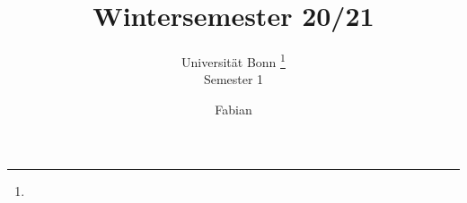 \documentclass[a4paper, 10pt, oneside, openany,  bibliography=totocnumbered]{scrbook}
\begin{document}
\subject{Vorlesungsmitschriften}
\title{Wintersemester 20/21}
\subtitle{
  Universität Bonn \footnote{
   \centering
  }
  \\
  Semester 1
}
\author{Fabian}
\publishers{
  Online aufrufbar auf \texttt{\url{https://github.com/git-fabus/lecutres/blob/main/notes.pdf}.}
  \\
 Veränderungsvorschläge und Verbesserungen bitte an 
}

\frontmatter
\maketitle

\tableofcontents

\mainmatter




\appendix %
%

\backmatter
%
\end{document}
